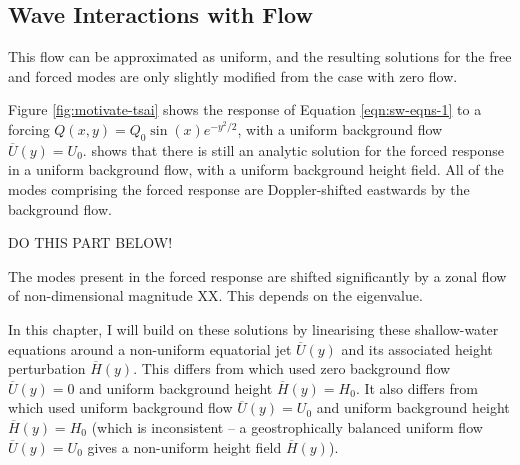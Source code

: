 \subsection{Wave Interactions with Flow}

This flow can be approximated as uniform, and the resulting solutions for the free and forced modes are only slightly modified from the case with zero flow.

Figure \ref{fig:motivate-tsai} shows the response of Equation \ref{eqn:sw-eqns-1} to a forcing $Q(x,y) = Q_{0} \sin(x) e^{-y^{2}/2}$, with a uniform background flow $\overline{U}(y) = U_{0}$. \citet{tsai2014three} shows that there is still an analytic solution for the forced response in a uniform background flow, with a uniform background height field. All of the modes comprising the forced response are Doppler-shifted eastwards by the background flow.

DO THIS PART BELOW!

The modes present in the forced response are shifted significantly by a zonal flow of non-dimensional magnitude XX. This depends on the eigenvalue.

In this chapter, I will build on these solutions by linearising these shallow-water equations around a non-uniform equatorial jet $\overline{U}(y)$ and its associated height perturbation $\overline{H}(y)$. This differs from \citet{showman2011superrotation} which used zero background flow $\overline{U}(y)=0$ and uniform background height $\overline{H}(y) = H_{0}$. It also differs from \citet{tsai2014three} which used uniform background flow $\overline{U}(y)=U_{0}$ and uniform background height $\overline{H}(y) = H_{0}$ (which is inconsistent -- a geostrophically balanced uniform flow $\overline{U}(y)=U_{0}$ gives a non-uniform height field $\overline{H}(y)$).




%








